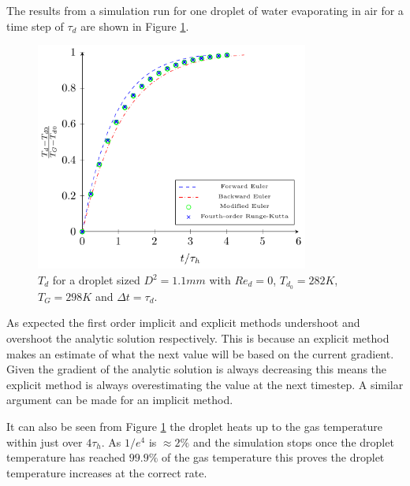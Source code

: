 \documentclass[../Interim_Report_Master]{subfiles}
\begin{document}
The results from a simulation run for one droplet of water evaporating in air for a time step of $\tau_d$ are shown in Figure \ref{temp_time_tau}. 
\begin{figure}[H]
	\centering
	\includegraphics[width=0.8\textwidth]{./Diagrams/Uncoupled_Heat_Transfer_tau/Uncoupled_Heat_Transfer_tau.pdf}
	\caption{$T_d$ for a droplet sized $D^2=1.1mm$ with $Re_d=0$, $T_{d_0}=282K$, $T_G=298K$ and $\Delta t=\tau_d$.}
	\label{temp_time_tau}
\end{figure}

As expected the first order implicit and explicit methods undershoot and overshoot the analytic solution respectively. This is because an explicit method makes an estimate of what the next value will be based on the current gradient. Given the gradient of the analytic solution is always decreasing this means the explicit method is always overestimating the value at the next timestep. A similar argument can be made for an implicit method.

It can also be seen from Figure \ref{temp_time_tau} the droplet heats up to the gas temperature within just over $4\tau_h$. As $1/e^4$ is $\approx 2\%$ and the simulation stops once the droplet temperature has reached $99.9\%$ of the gas temperature this proves the droplet temperature increases at the correct rate.
\end{document}
